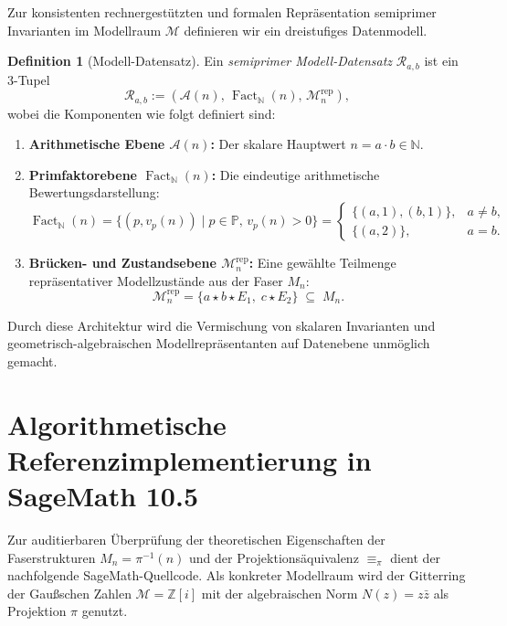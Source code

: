 \documentclass[11pt,a4paper,reqno]{amsart}
\theoremstyle{definition}
\newtheorem{definition}[theorem]{Definition}
\theoremstyle{remark}
\newcommand{\M}{\mathcal{M}}
\newcommand{\N}{\mathbb{N}}
\newcommand{\Pset}{\mathbb{P}}
\newcommand{\Z}{\mathbb{Z}}
\newcommand{\Fact}{\operatorname{Fact}}
\begin{document}
Zur konsistenten rechnergestützten und formalen Repräsentation semiprimer Invarianten im Modellraum $\M$ definieren wir ein dreistufiges Datenmodell.

\begin{definition}[Modell-Datensatz]
Ein \emph{semiprimer Modell-Datensatz} $\mathcal{R}_{a,b}$ ist ein 3-Tupel
\begin{equation}
\mathcal{R}_{a,b} := \left( \mathcal{A}(n), \, \Fact_\N(n), \, \mathcal{M}_n^{\operatorname{rep}} \right),
\end{equation}
wobei die Komponenten wie folgt definiert sind:
\begin{enumerate}
    \item \textbf{Arithmetische Ebene $\mathcal{A}(n)$:} Der skalare Hauptwert $n = a \cdot b \in \N$.
    \item \textbf{Primfaktorebene $\Fact_\N(n)$:} Die eindeutige arithmetische Bewertungsdarstellung:
    \begin{equation}
    \Fact_\N(n) = \{ (p, v_p(n)) \mid p \in \Pset, \, v_p(n) > 0 \} = \begin{cases} \{ (a,1), (b,1) \}, & a \neq b, \\ \{ (a,2) \}, & a = b. \end{cases}
    \end{equation}
    \item \textbf{Brücken- und Zustandsebene $\mathcal{M}_n^{\operatorname{rep}}$:} Eine gewählte Teilmenge repräsentativer Modellzustände aus der Faser $M_n$:
    \begin{equation}
    \mathcal{M}_n^{\operatorname{rep}} = \{ a \star b \star E_1, \; c \star E_2 \} \;\subseteq\; M_n.
    \end{equation}
\end{enumerate}
\end{definition}

Durch diese Architektur wird die Vermischung von skalaren Invarianten und geometrisch-algebraischen Modellrepräsentanten auf Datenebene unmöglich gemacht.

\section{Algorithmetische Referenzimplementierung in SageMath 10.5}

Zur auditierbaren Überprüfung der theoretischen Eigenschaften der Faserstrukturen $M_n = \pi^{-1}(n)$ und der Projektionsäquivalenz $\equiv_\pi$ dient der nachfolgende SageMath-Quellcode. Als konkreter Modellraum wird der Gitterring der Gaußschen Zahlen $\M = \Z[i]$ mit der algebraischen Norm $N(z) = z \bar{z}$ als Projektion $\pi$ genutzt.
\end{document}

